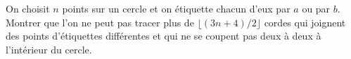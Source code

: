 On choisit $n$ points sur un cercle et on étiquette chacun d'eux par $a$ ou par $b$. Montrer que l'on ne peut pas tracer plus de $\lfloor (3n + 4)/2 \rfloor$ cordes qui joignent des points d'étiquettes différentes et qui ne se coupent pas deux à deux à l'intérieur du cercle.
